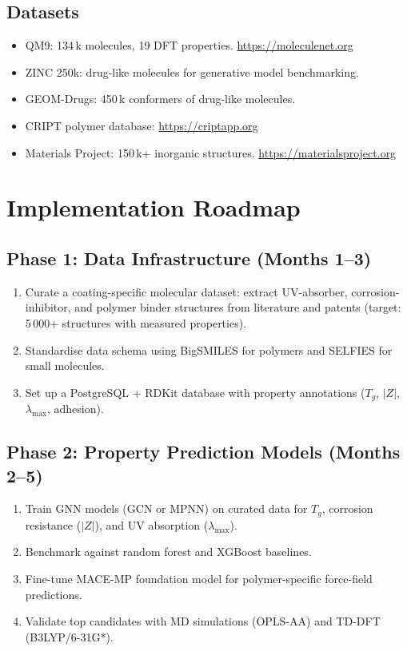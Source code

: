 \documentclass[11pt,a4paper]{article}
\begin{document}
\subsection{Datasets}
\begin{itemize}[nosep]
  \item QM9: 134\,k molecules, 19 DFT properties. \url{https://moleculenet.org}
  \item ZINC 250k: drug-like molecules for generative model benchmarking.
  \item GEOM-Drugs: 450\,k conformers of drug-like molecules.
  \item CRIPT polymer database: \url{https://criptapp.org}
  \item Materials Project: 150\,k+ inorganic structures. \url{https://materialsproject.org}
\end{itemize}

\section{Implementation Roadmap}
\label{sec:roadmap}

\subsection{Phase 1: Data Infrastructure (Months 1--3)}
\begin{enumerate}[nosep]
  \item Curate a coating-specific molecular dataset: extract UV-absorber, corrosion-inhibitor, and polymer binder structures from literature and patents (target: 5\,000+ structures with measured properties).
  \item Standardise data schema using BigSMILES for polymers and SELFIES for small molecules.
  \item Set up a PostgreSQL + RDKit database with property annotations ($T_g$, $|Z|$, $\lambda_\text{max}$, adhesion).
\end{enumerate}

\subsection{Phase 2: Property Prediction Models (Months 2--5)}
\begin{enumerate}[nosep]
  \item Train GNN models (GCN or MPNN) on curated data for $T_g$, corrosion resistance ($|Z|$), and UV absorption ($\lambda_\text{max}$).
  \item Benchmark against random forest and XGBoost baselines.
  \item Fine-tune MACE-MP foundation model for polymer-specific force-field predictions.
  \item Validate top candidates with MD simulations (OPLS-AA) and TD-DFT (B3LYP/6-31G*).
\end{enumerate}
\end{document}
